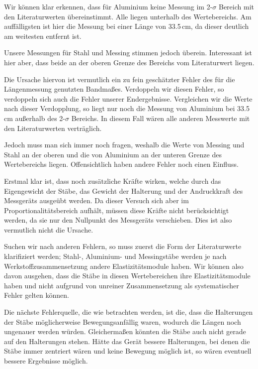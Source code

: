 \documentclass[11pt,a4paper]{article}
\begin{document}
Wir k\"onnen klar erkennen, dass f\"ur Aluminium keine Messung im 2-$\sigma$ Bereich mit den Literaturwerten \"ubereinstimmt. Alle liegen unterhalb des Wertebereichs. Am auff\"alligsten ist hier die Messung bei einer L\"ange von 33.5\,cm, da dieser deutlich am weitesten entfernt ist.

Unsere Messungen f\"ur Stahl und Messing stimmen jedoch \"uberein. Interessant ist hier aber, dass beide an der oberen Grenze des Bereichs vom Literaturwert liegen.

Die Ursache hiervon ist vermutlich ein zu fein gesch\"atzter Fehler des f\"ur die L\"angenmessung genutzten Bandma\ss es. Verdoppeln wir diesen Fehler, so verdoppeln sich auch die Fehler unserer Endergebnisse. Vergleichen wir die Werte nach dieser Verdopplung, so liegt nur noch die Messung von Aluminium bei 33.5\,cm au\ss erhalb des 2-$\sigma$ Bereichs. In diesem Fall w\"aren alle anderen Messwerte mit den Literaturwerten vertr\"aglich.

Jedoch muss man sich immer noch fragen, weshalb die Werte von Messing und Stahl an der oberen und die von Aluminium an der unteren Grenze des Wertebereichs liegen. Offensichtlich haben andere Fehler noch einen Einfluss.

Erstmal klar ist, dass noch zus\"atzliche Kr\"afte wirken, welche durch das Eigengewicht der St\"abe, das Gewicht der Halterung und der Andruckkraft des Messger\"ats ausge\"ubt werden. Da dieser Versuch sich aber im Proportionalit\"atsbereich aufh\"alt, m\"ussen diese Kr\"afte nicht ber\"ucksichtigt werden, da sie nur den Nullpunkt des Messger\"ats verschieben. Dies ist also vermutlich nicht die Ursache.

Suchen wir nach anderen Fehlern, so muss zuerst die Form der Literaturwerte klarifiziert werden; Stahl-, Aluminium- und Messingst\"abe werden je nach Werkstoffzusammensetzung andere Elastizit\"atsmodule haben. Wir k\"onnen also davon ausgehen, dass die St\"abe in diesen Wertebereichen ihre Elastizit\"atsmodule haben und nicht aufgrund von unreiner Zusammensetzung als systematischer Fehler gelten k\"onnen.

Die n\"achste Fehlerquelle, die wie betrachten werden, ist die, dass die Halterungen der St\"abe m\"oglicherweise Bewegungsanf\"allig waren, wodurch die L\"angen noch ungenauer werden w\"urden. Gleicherma\ss en k\"onnten die St\"abe auch nicht gerade auf den Halterungen stehen. H\"atte das Ger\"at bessere Halterungen, bei denen die St\"abe immer zentriert w\"aren und keine Bewegung m\"oglich ist, so w\"aren eventuell bessere Ergebnisse m\"oglich.
\end{document}
